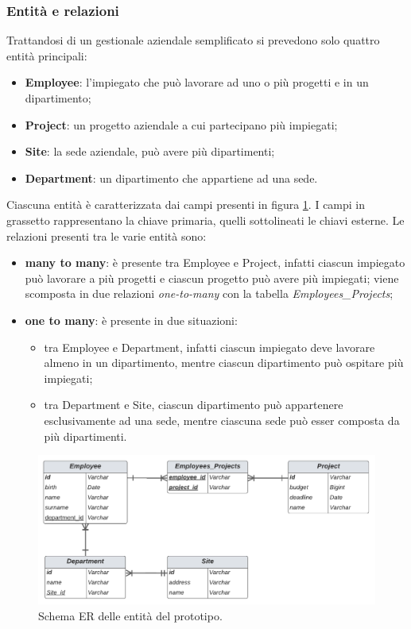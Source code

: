 \subsubsection*{Entità e relazioni}
\label{entity-relation}
Trattandosi di un gestionale aziendale semplificato si prevedono solo quattro entità principali:
\begin{itemize}
  \item \textbf{Employee}: l'impiegato che può lavorare ad uno o più progetti e in un dipartimento;
  \item \textbf{Project}: un progetto aziendale a cui partecipano più impiegati;
  \item \textbf{Site}: la sede aziendale, può avere più dipartimenti;
  \item \textbf{Department}: un dipartimento che appartiene ad una sede.
\end{itemize}
Ciascuna entità è caratterizzata dai campi presenti in figura \ref{ER-prototype}. I campi in grassetto rappresentano la chiave primaria, quelli sottolineati le chiavi esterne. Le relazioni presenti tra le varie entità sono:
\begin{itemize}
  \item \textbf{many to many}: è presente tra Employee e Project, infatti ciascun impiegato può lavorare a più progetti e ciascun progetto può avere più impiegati; viene scomposta in due relazioni \textit{one-to-many} con la tabella \textit{Employees\_Projects};
  \item \textbf{one to many}: è presente in due situazioni:
  \begin{itemize}
    \item tra Employee e Department, infatti ciascun impiegato deve lavorare almeno in un dipartimento, mentre ciascun dipartimento può ospitare più impiegati;
    \item tra Department e Site, ciascun dipartimento può appartenere esclusivamente ad una sede, mentre ciascuna sede può esser composta da più dipartimenti.
  \end{itemize}
\end{itemize}
\FloatBarrier
\begin{figure}[!ht]
\centering
\includegraphics[width=1\linewidth]{immagini/ER_prototype.pdf}
\caption{Schema ER delle entità del prototipo.}
\label{ER-prototype}
\end{figure}
\FloatBarrier
